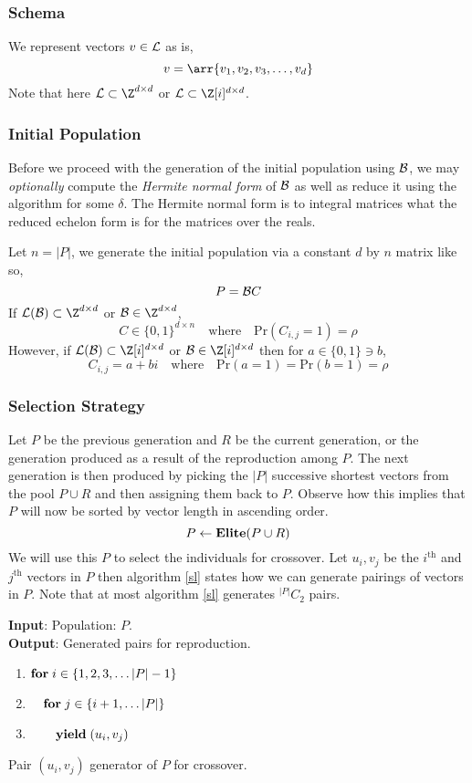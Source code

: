 \documentclass{homework}
\begin{document}
\subsubsection{Schema} We represent vectors $v \in \mathcal{L}$ as is,
\[
  v = \arr{v_1, v_2, v_3, \dots, v_d}
\]
Note that here $\L \subset \Z^{d\times d}$ or $\L \subset \G^{d\times d}$.

\subsubsection{Initial Population} Before we proceed with the
generation of the initial population using $\mathcal{B}$, we may
\textit{optionally} compute the \textit{Hermite normal form} of $\mathcal{B}$
as well as reduce it using the \LLL{} algorithm for some $\delta$. The
Hermite normal form is to integral matrices what the reduced echelon
form is for the matrices over the reals.

Let $n = |P|$, we generate the initial population via a constant $d$
by $n$ matrix like so,
\[
  P = \mathcal{B} C
\]
If $\L(\B) \subset \Z^{d\times d}$ or $\B \in \Z^{d\times d}$,
\[
  C \in \{0, 1\}^{d\times n}\quad\text{where}\quad
  \text{Pr}(C_{i,j} = 1) = \rho
\]
However, if $\L(\B) \subset \G^{d\times d}$ or $\B \in \G^{d\times d}$
then for $a \in \{0, 1\} \ni b$,
\[
  C_{i,j} = a + bi\quad\text{where}\quad
  \text{Pr}(a = 1) = \text{Pr}(b = 1) = \rho
\]

\subsubsection{Selection Strategy} Let $P$ be the previous generation
and $R$ be the current generation, or the generation produced as a
result of the reproduction among $P$. The next generation is then
produced by picking the $|P|$ successive shortest vectors from the
pool $P \cup R$ and then assigning them back to $P$. Observe how this
implies that $P$ will now be sorted by vector length in ascending
order.
\[
  P \leftarrow \mathbf{Elite}(P \cup R)
\]
We will use this $P$ to select the individuals for crossover. Let
$u_i, v_j$ be the $i^\text{th}$ and $j^\text{th}$ vectors in $P$ then
algorithm \ref{sl} states how we can generate pairings of vectors in
$P$. Note that at most algorithm \ref{sl} generates $^{|P|}C_2$ pairs.

\begin{algorithm}
  \begin{flushleft}
    \noindent\textbf{Input}: Population: $P$. \\
    \noindent\textbf{Output}: Generated pairs for reproduction.
  \end{flushleft}
  \begin{enumerate}[label=\arabic*:]
    \item $\mathbf{for\;} i \in \{1, 2, 3, \dots |P| - 1\}$
    \item $\quad \mathbf{for\;} j \in \{i + 1, \dots |P|\}$
    \item $\quad\quad \mathbf{yield\;} (u_i, v_j)$
  \end{enumerate}
  \caption{Pair $(u_i, v_j)$ generator of $P$ for crossover.}
  \label{sl}
\end{algorithm}
\end{document}
